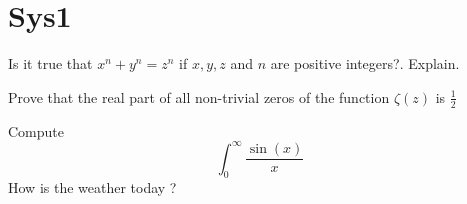 \documentclass[addpoints,12pt,twoside]{exam} %
\begin{document}
\section*{Sys1}
\begin{questions}
    \question Is it true that \(x^n + y^n = z^n\) if \(x,y,z\) and \(n\) are
    positive integers?. Explain.
    
    \question Prove that the real part of all non-trivial zeros of the function
    \(\zeta(z)\) is \(\frac{1}{2}\)
    
    \question Compute \[\int_{0}^{\infty} \frac{\sin(x)}{x}\]
    \question
    How is the weather today ?
\end{questions}
\end{document}
